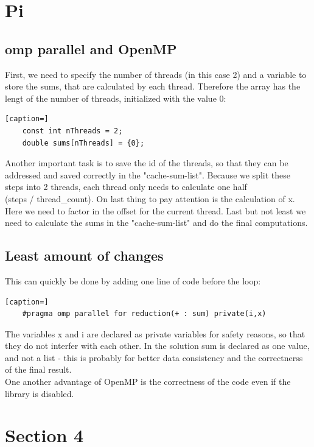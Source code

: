\documentclass{article}
\begin{document}
\section{Pi}
\subsection{omp parallel and OpenMP}
First, we need to specify the number of threads (in this case 2) and a
variable to store the sums, that are calculated by each thread. Therefore
the array has the lengt of the number of threads, initialized with the
value 0:
\begin{lstlisting}[caption=]
    const int nThreads = 2;
    double sums[nThreads] = {0};
\end{lstlisting}
Another important task is to save the id of the threads, so that they
can be addressed and saved correctly in the "cache-sum-list".
Because we split these steps into 2 threads, each thread only needs
to calculate one half \\(steps / thread\_count). On last thing to pay
attention is the calculation of x. Here we need to factor in the offset
for the current thread. Last but not least we need to calculate the sums
in the "cache-sum-list" and do the final computations.

\subsection*{Least amount of changes}
This can quickly be done by adding one line of code before the loop:
\begin{lstlisting}[caption=]
    #pragma omp parallel for reduction(+ : sum) private(i,x)
\end{lstlisting}
The variables x and i are declared as private variables for safety reasons,
so that they do not interfer with each other. In the solution sum is
declared as one value, and not a list - this is probably for better
data consistency and the correctnerss of the final result.\\
One another advantage of OpenMP is the correctness of the code even if the library
is disabled.




\section*{Section 4}


  
\end{document}
